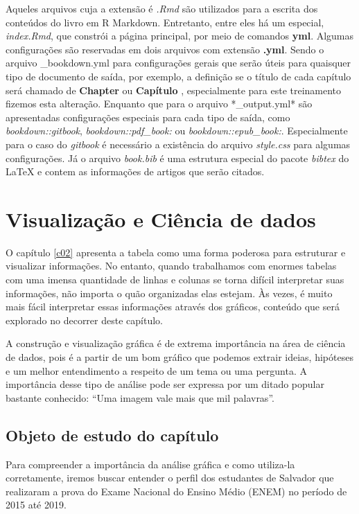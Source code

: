 \documentclass[
  oneside]{book}
\begin{document}
Aqueles arquivos cuja a extensão é \emph{.Rmd}
são utilizados para a escrita dos
conteúdos do livro em R Markdown. Entretanto,
entre eles
há um especial, \emph{index.Rmd}, que constrói
a página principal, por meio de
comandos \textbf{yml}. Algumas configurações
são reservadas em dois arquivos com extensão
\textbf{.yml}. Sendo o arquivo \_bookdown.yml para
configurações gerais que serão úteis para quaisquer
tipo de documento de saída, por exemplo, a definição
se o título de cada capítulo será chamado de
\textbf{Chapter } ou \textbf{Capítulo }, especialmente
para este treinamento fizemos esta alteração. Enquanto
que para o arquivo *\_output.yml* são apresentadas
configurações especiais para cada tipo de saída,
como \emph{bookdown::gitbook}, \emph{bookdown::pdf\_book:} ou
\emph{bookdown::epub\_book:}. Especialmente para o
caso do \emph{gitbook} é necessário a existência do arquivo
\emph{style.css} para algumas configurações. Já o arquivo
\emph{book.bib} é uma estrutura especial do pacote \emph{bibtex}
do LaTeX e contem as informações de artigos que serão citados.

\hypertarget{c03}{%
\chapter{Visualização e Ciência de dados}\label{c03}}

O capítulo \ref{c02} apresenta a tabela como uma forma poderosa para estruturar e visualizar informações. No entanto, quando trabalhamos com enormes tabelas com uma imensa quantidade de linhas e colunas se torna difícil interpretar suas informações, não importa o quão organizadas elas estejam. Às vezes, é muito mais fácil interpretar essas informações através dos gráficos, conteúdo que será explorado no decorrer deste capítulo.

A construção e visualização gráfica é de extrema importância na área de ciência de dados, pois é a partir de um bom gráfico que podemos extrair ideias, hipóteses e um melhor entendimento a respeito de um tema ou uma pergunta. A importância desse tipo de análise pode ser expressa por um ditado popular bastante conhecido: ``Uma imagem vale mais que mil palavras''.

\hypertarget{objeto-estudo}{%
\section{Objeto de estudo do capítulo}\label{objeto-estudo}}

Para compreender a importância da análise gráfica e como utiliza-la corretamente, iremos buscar entender o perfil dos estudantes de Salvador que realizaram a prova do Exame Nacional do Ensino Médio (ENEM) no período de 2015 até 2019.
\end{document}
